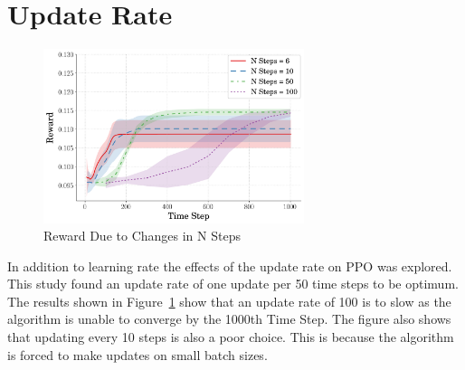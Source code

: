 \documentclass[10pt,twocolumn,letterpaper]{article}
\begin{document}
\section{Update Rate}
\label{app:ur_changes}

\begin{figure}[b]
\begin{center}
        \includegraphics[width = 3in]{figures/ppo_n_steps/avg_rew_ppo.png}
        \caption{Reward Due to Changes in N Steps}
        \label{fig:n_steps}
\end{center}
\end{figure}

In addition to learning rate the effects of the update rate on PPO was explored. This study found an update rate of one update per 50 time steps to be optimum. The results shown in Figure~\ref{fig:n_steps} show that an update rate of 100 is to slow as the algorithm is unable to converge by the 1000th Time Step. The figure also shows that updating every 10 steps is also a poor choice. This is because the
algorithm is forced to make updates on small batch sizes.
\end{document}

